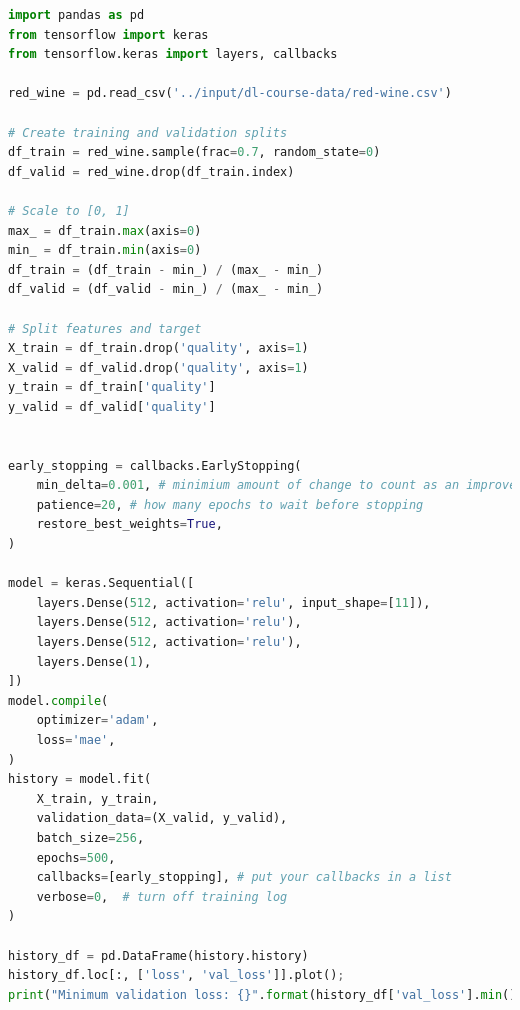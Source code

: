 \begin{lstlisting}[language=Python]
import pandas as pd
from tensorflow import keras
from tensorflow.keras import layers, callbacks

red_wine = pd.read_csv('../input/dl-course-data/red-wine.csv')

# Create training and validation splits
df_train = red_wine.sample(frac=0.7, random_state=0)
df_valid = red_wine.drop(df_train.index)

# Scale to [0, 1]
max_ = df_train.max(axis=0)
min_ = df_train.min(axis=0)
df_train = (df_train - min_) / (max_ - min_)
df_valid = (df_valid - min_) / (max_ - min_)

# Split features and target
X_train = df_train.drop('quality', axis=1)
X_valid = df_valid.drop('quality', axis=1)
y_train = df_train['quality']
y_valid = df_valid['quality']


early_stopping = callbacks.EarlyStopping(
    min_delta=0.001, # minimium amount of change to count as an improvement
    patience=20, # how many epochs to wait before stopping
    restore_best_weights=True,
)

model = keras.Sequential([
    layers.Dense(512, activation='relu', input_shape=[11]),
    layers.Dense(512, activation='relu'),
    layers.Dense(512, activation='relu'),
    layers.Dense(1),
])
model.compile(
    optimizer='adam',
    loss='mae',
)
history = model.fit(
    X_train, y_train,
    validation_data=(X_valid, y_valid),
    batch_size=256,
    epochs=500,
    callbacks=[early_stopping], # put your callbacks in a list
    verbose=0,  # turn off training log
)

history_df = pd.DataFrame(history.history)
history_df.loc[:, ['loss', 'val_loss']].plot();
print("Minimum validation loss: {}".format(history_df['val_loss'].min()))
\end{lstlisting}


